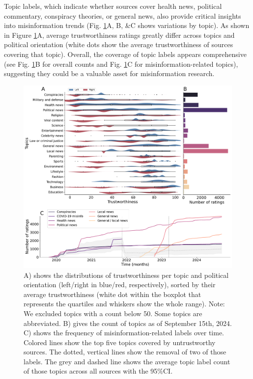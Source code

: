 \documentclass{article}
\begin{document}
Topic labels, which indicate whether sources cover health news, political commentary, conspiracy theories, or general news, also provide critical insights into misinformation trends (Fig. \ref{fig:topics_panel}A, B, \&C shows variations by topic).
As shown in Figure \ref{fig:topics_panel}A, average trustworthiness ratings greatly differ across topics and political orientation (white dots show the average trustworthiness of sources covering that topic).
Overall, the coverage of topic labels appears comprehensive (see Fig. \ref{fig:topics_panel}B for overall counts and Fig. \ref{fig:topics_panel}C for misinformation-related topics), suggesting they could be a valuable asset for misinformation research.

\begin{figure}[htbp]
    \centering
    \includegraphics[width=\textwidth]{figures/topics_panel.pdf}
    \caption{A) shows the distributions of trustworthiness per topic and political orientation (left/right in blue/red, respectively), sorted by their average trustworthiness (white dot within the boxplot that represents the quartiles and whiskers show the whole range). 
    Note: We excluded topics with a count below 50. Some topics are abbreviated. B) gives the count of topics as of September 15th, 2024.
    C) shows the frequency of misinformation-related labels over time.
    Colored lines show the top five topics covered by untrustworthy sources. 
    The dotted, vertical lines show the removal of two of those labels.
    The grey and dashed line shows the average topic label count of those topics across all sources with the 95\%CI.}
    \label{fig:topics_panel}
\end{figure}
\end{document}
